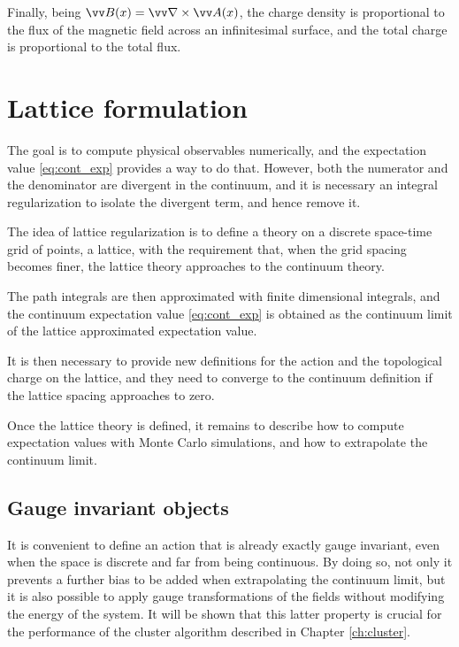 Finally, being $\vv B(x) = \vv\nabla \times \vv A(x)$, the charge density is proportional to the flux of the magnetic field across an infinitesimal surface,
and the total charge is proportional to the total flux.

\section{Lattice formulation}
The goal is to compute physical observables numerically, and the expectation value \eqref{eq:cont_exp} provides a way to do that.
However, both the numerator and the denominator are divergent in the continuum, and it is necessary an integral regularization to isolate the divergent term,
and hence remove it.

The idea of lattice regularization is to define a theory on a discrete space-time grid of points, \ie a lattice,
with the requirement that, when the grid spacing becomes finer,
the lattice theory approaches to the continuum theory.

The path integrals are then approximated with finite dimensional integrals,
and the continuum expectation value \eqref{eq:cont_exp} is obtained as the continuum limit of the lattice approximated expectation value.

It is then necessary to provide new definitions for the action and the topological charge on the lattice,
and they need to converge to the continuum definition if the lattice spacing approaches to zero.

Once the lattice theory is defined, it remains to describe how to compute expectation values with Monte Carlo simulations, and how to extrapolate the continuum limit.

\subsection*{Gauge invariant objects}

It is convenient to define an action that is already exactly gauge invariant, even when the space is discrete and far from being continuous.
By doing so, not only it prevents a further bias to be added when extrapolating the continuum limit,
but it is also possible to apply gauge transformations of the fields without modifying the energy of the system.
It will be shown that this latter property is crucial for the performance of the cluster algorithm described in Chapter \ref{ch:cluster}.

